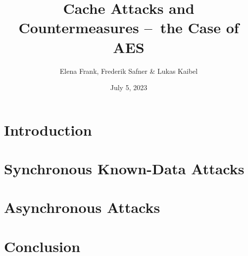 \documentclass{article}
\title{\textbf{Cache Attacks and Countermeasures – the Case of AES}}
\author{Elena Frank, Frederik Safner \& Lukas Kaibel}
\date{July 5, 2023}
\begin{document}
\maketitle

\tableofcontents

\newpage

\section{Introduction}

\section{Synchronous Known-Data Attacks}


\section{Asynchronous Attacks}





\section{Conclusion}

\end{document}
